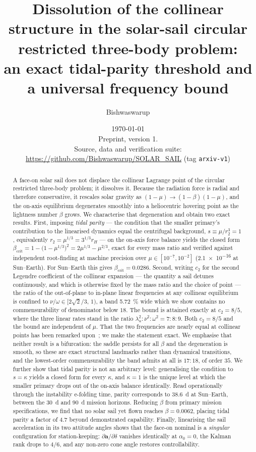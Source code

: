 \documentclass[11pt,a4paper]{article}
\title{\bfseries Dissolution of the collinear structure in the
solar-sail circular restricted three-body problem:\\
an exact tidal-parity threshold and a universal frequency bound}
\author[1]{Bishwaswarup}
\affil[1]{\small Indian Institute of Science, Bangalore 560012, India\\
\texttt{bishwaswarup@iisc.ac.in}}
\date{\today\\[6pt]
\normalsize Preprint, version 1.\\[2pt]
\small Source, data and verification suite:
\url{https://github.com/Bishwaswarup/SOLAR_SAIL} (tag \texttt{arxiv-v1})}
\begin{document}
\maketitle

\begin{abstract}
\noindent
A face-on solar sail does not displace the collinear Lagrange point of the
circular restricted three-body problem; it dissolves it. Because the radiation
force is radial and therefore conservative, it rescales solar gravity as
$(1-\mu)\to(1-\beta)(1-\mu)$, and the on-axis equilibrium degenerates smoothly
into a heliocentric hovering point as the lightness number $\beta$ grows. We
characterise that degeneration and obtain two exact results. First, imposing
\emph{tidal parity} --- the condition that the smaller primary's contribution to
the linearised dynamics equal the centrifugal background, $s\equiv\mu/r_2^3=1$,
equivalently $r_2=\mu^{1/3}=3^{1/3}r_H$ --- on the on-axis force balance yields
the closed form
$\beta_{\mathrm{crit}}=1-\bigl(1-\mu^{1/3}\bigr)^2=2\mu^{1/3}-\mu^{2/3}$,
exact for every mass ratio and verified against independent root-finding at
machine precision over $\mu\in[10^{-7},10^{-2}]$ (\num{2.1e-16} at Sun--Earth). For Sun--Earth this gives
$\beta_{\mathrm{crit}}=0.0286$. Second, writing $c_2$ for the second Legendre
coefficient of the collinear expansion --- the quantity a sail detunes
continuously, and which is otherwise fixed by the mass ratio and the choice of
point --- the ratio of the out-of-plane to in-plane linear frequencies at any
collinear equilibrium is confined to $\nu/\omega\in[2\sqrt2/3,\,1)$, a band
\SI{5.72}{\percent} wide which we show contains no commensurability of
denominator below $18$. The bound is attained
exactly at $c_2=8/5$, where the three linear rates stand in the ratio
$\lambda_u^2:\nu^2:\omega^2=7:8:9$. Both $c_2=8/5$ and the bound are independent
of $\mu$. That the two frequencies are nearly equal at collinear points has been
remarked upon~\cite{ceccaroni2016}; we make the statement exact. We emphasise that neither result is a bifurcation: the saddle persists
for all $\beta$ and the degeneration is smooth, so these are exact structural
landmarks rather than dynamical transitions, and the lowest-order
commensurability the band admits at all is $17{:}18$, of order $35$. We further
show that tidal parity is not an arbitrary level: generalising the condition to
$s=\kappa$ yields a closed form for every $\kappa$, and $\kappa=1$ is the unique
level at which the smaller primary drops out of the on-axis balance identically.
Read operationally through the instability e-folding time, parity corresponds to
\SI{38.6}{\day} at Sun--Earth, between the \SI{30}{\day} and \SI{90}{\day}
mission horizons. Reducing $\beta$ from primary
mission specifications, we find that no solar sail yet flown reaches
$\beta=0.0062$, placing tidal parity a factor of $4.7$ beyond demonstrated
capability. Finally, linearising the sail acceleration in its two attitude
angles shows that the face-on nominal is a \emph{singular} configuration for
station-keeping: $\partial\bm{a}/\partial\delta$ vanishes identically at
$\alpha_0=0$, the Kalman rank drops to $4/6$, and any non-zero cone angle
restores controllability.
\end{abstract}
\end{document}
